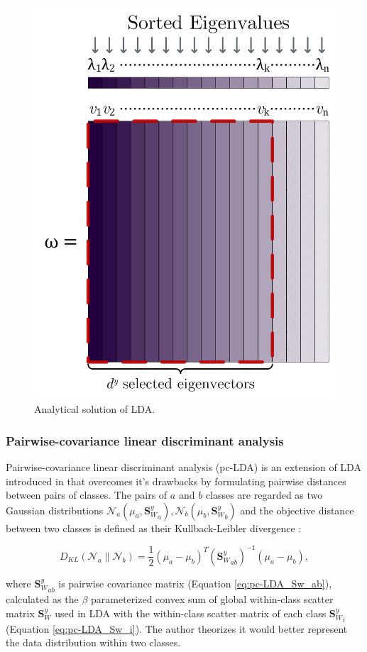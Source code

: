         \begin{figure}[htbp]
            \centering
            \includegraphics[width=0.4\linewidth]{figs/lda_solution.png}
            \caption{Analytical solution of LDA.}
            \label{fig:lda_solution}
        \end{figure}

    \subsubsection{Pairwise-covariance linear discriminant analysis}
        Pairwise-covariance linear discriminant analysis (pc-LDA) is an extension of LDA introduced in \cite{kong2014pairwise} that overcomes it's drawbacks by formulating pairwise distances between pairs of classes.
        The pairs of $a$ and $b$ classes are regarded as two Gaussian distributions $\mathcal{N}_a(\mu_a,{\boldsymbol{S}_W^y}_a), \mathcal{N}_b(\mu_b,{\boldsymbol{S}_W^y}_b)$ and the objective distance between two classes is defined as their Kullback-Leibler divergence \cite{kullback1951}:

        \begin{equation}
            D_{KL}\left(\mathcal{N}_a\parallel\mathcal{N}_b\right)=\frac{1}{2}\left(\mu_a-\mu_b\right)^{T}{\left({\boldsymbol{S}_W^y}_{ab}\right)}^{-1}\left(\mu_a-\mu_b\right),
        \end{equation}

        where ${\boldsymbol{S}_W^y}_{ab}$ is pairwise covariance matrix (Equation \eqref{eq:pc-LDA_Sw_ab}), calculated as the $\beta$ parameterized convex sum of global within-class scatter matrix $\boldsymbol{S}_W^y$ used in LDA with the within-class scatter matrix of each class ${\boldsymbol{S}_W^y}_i$ (Equation \eqref{eq:pc-LDA_Sw_i}).
        The author theorizes it would better represent the data distribution within two classes.

